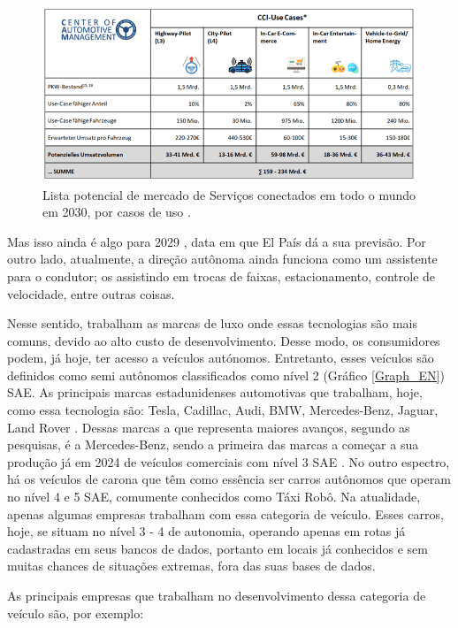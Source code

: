 \begin{figure}[H]
\centering
\includegraphics[width=\textwidth]{Figures/grafik-2.png}
\caption{ Lista potencial de mercado de Serviços conectados em todo o mundo em 2030, por casos de uso \cite{CAM}.}
\label{conectados}
\end{figure}


Mas isso ainda é algo para 2029 \cite{elpais}, data em que El País dá a sua previsão. Por outro lado, atualmente, a direção autônoma ainda funciona como um assistente para o condutor; os assistindo em trocas de faixas, estacionamento, controle de velocidade, entre outras coisas. 

Nesse sentido, trabalham as marcas de luxo onde essas tecnologias são mais comuns, devido ao alto custo de desenvolvimento. Desse modo, os consumidores podem, já hoje, ter acesso a veículos autónomos. Entretanto, esses veículos são definidos como semi autônomos classificados como nível 2 (Gráfico \ref{Graph_EN}) SAE. As principais marcas estadunidenses automotivas que trabalham, hoje, como essa tecnologia são:  Tesla, Cadillac, Audi, BMW, Mercedes-Benz, Jaguar, Land Rover \cite{caio}. 
Dessas marcas a que representa maiores avanços, segundo as pesquisas, é a Mercedes-Benz, sendo  a primeira das marcas a começar a sua produção já em 2024 de veículos comerciais com nível 3 SAE \cite{mercedes3}.
No outro espectro, há os veículos de carona que têm como essência ser carros autônomos que operam no nível 4 e 5 SAE, comumente conhecidos como Táxi Robô. Na atualidade, apenas algumas empresas trabalham com essa categoria de veículo. Esses carros, hoje, se situam no nível 3 - 4 de autonomia, operando apenas em rotas já cadastradas em seus bancos de dados, portanto em locais já conhecidos e sem muitas chances de situações extremas, fora das suas bases de dados. 

As principais empresas que trabalham no desenvolvimento dessa categoria de veículo são, por exemplo:

